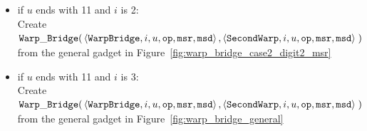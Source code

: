 \begin{itemize}
\begin{itemize}
            \item if $u$ ends with 11 and $i$ is 2: \\
            Create
            $\begin{aligned}[t]
                {\tt Warp\_Bridge}(& \left\langle {\tt WarpBridge}, i, u, {\tt op}, {\tt msr}, {\tt msd} \right\rangle,
                              \left\langle {\tt SecondWarp}, i, u, {\tt op}, {\tt msr}, {\tt msd} \right\rangle \;)
            \end{aligned}$ \\ from the general gadget in Figure~\ref{fig:warp_bridge_case2_digit2_msr}
            \vspace{.5cm}

            \item if $u$ ends with 11 and $i$ is 3: \\
            Create
            $\begin{aligned}[t]
                {\tt Warp\_Bridge}(& \left\langle {\tt WarpBridge}, i, u, {\tt op}, {\tt msr}, {\tt msd} \right\rangle,
                              \left\langle {\tt SecondWarp}, i, u, {\tt op}, {\tt msr}, {\tt msd} \right\rangle \;)
            \end{aligned}$ \\ from the general gadget in Figure~\ref{fig:warp_bridge_general}
            \vspace{.5cm}
        \end{itemize}


\end{itemize}
